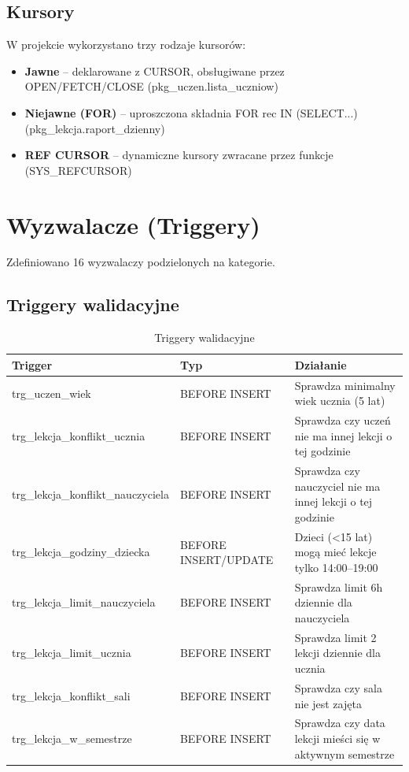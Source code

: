 \documentclass[12pt,a4paper]{article}
\begin{document}
\subsection{Kursory}
W projekcie wykorzystano trzy rodzaje kursorów:
\begin{itemize}[nosep]
    \item \textbf{Jawne} -- deklarowane z CURSOR, obsługiwane przez OPEN/FETCH/CLOSE (pkg\_uczen.lista\_uczniow)
    \item \textbf{Niejawne (FOR)} -- uproszczona składnia FOR rec IN (SELECT...) (pkg\_lekcja.raport\_dzienny)
    \item \textbf{REF CURSOR} -- dynamiczne kursory zwracane przez funkcje (SYS\_REFCURSOR)
\end{itemize}

\section{Wyzwalacze (Triggery)}

Zdefiniowano 16 wyzwalaczy podzielonych na kategorie.

\subsection{Triggery walidacyjne}

\begin{table}[h]
\centering
\begin{tabular}{|l|l|p{5cm}|}
\hline
\textbf{Trigger} & \textbf{Typ} & \textbf{Działanie} \\
\hline
trg\_uczen\_wiek & BEFORE INSERT & Sprawdza minimalny wiek ucznia (5 lat) \\
trg\_lekcja\_konflikt\_ucznia & BEFORE INSERT & Sprawdza czy uczeń nie ma innej lekcji o tej godzinie \\
trg\_lekcja\_konflikt\_nauczyciela & BEFORE INSERT & Sprawdza czy nauczyciel nie ma innej lekcji o tej godzinie \\
trg\_lekcja\_godziny\_dziecka & BEFORE INSERT/UPDATE & Dzieci (<15 lat) mogą mieć lekcje tylko 14:00--19:00 \\
trg\_lekcja\_limit\_nauczyciela & BEFORE INSERT & Sprawdza limit 6h dziennie dla nauczyciela \\
trg\_lekcja\_limit\_ucznia & BEFORE INSERT & Sprawdza limit 2 lekcji dziennie dla ucznia \\
trg\_lekcja\_konflikt\_sali & BEFORE INSERT & Sprawdza czy sala nie jest zajęta \\
trg\_lekcja\_w\_semestrze & BEFORE INSERT & Sprawdza czy data lekcji mieści się w aktywnym semestrze \\
\hline
\end{tabular}
\caption{Triggery walidacyjne}
\end{table}
\end{document}
